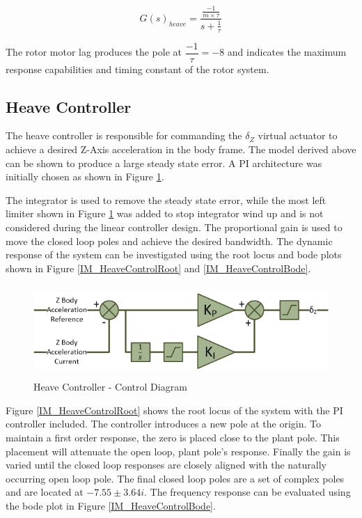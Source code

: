 \documentclass[12pt]{report}
\begin{document}
	\begin{equation}
	G(s)_{heave} = \frac{\frac{-1}{m \times \tau}}{s + \frac{1}{\tau}}\label{EQ_HeaveTF}
	\end{equation}
	
	The rotor motor lag produces the pole at $\dfrac{-1}{\tau} = -8$ and indicates the maximum response capabilities and timing constant of the rotor system.
	
	\subsection{Heave Controller}
	The heave controller is responsible for commanding the $\delta_Z$ virtual actuator to achieve a desired Z-Axis acceleration in the body frame. The model derived above can be shown to produce a large steady state error. A PI architecture was initially chosen as shown in Figure \ref{IM_HeaveController}. 
	
	The integrator is used to remove the steady state error, while the most left limiter shown in Figure \ref{IM_HeaveController} was added to stop integrator wind up and is not considered during the linear controller design. The proportional gain is used to move the closed loop poles and achieve the desired bandwidth. The dynamic response of the system can be investigated using the root locus and bode plots shown in Figure \ref{IM_HeaveControlRoot} and \ref{IM_HeaveControlBode}. 
	
	\begin{figure}[H]
		\centering
		\includegraphics[height = 3.5cm]{../References/Diagrams/HeaveController.jpg}
		\caption{Heave Controller -  Control Diagram}
		\label{IM_HeaveController}
	\end{figure}
	
	Figure \ref{IM_HeaveControlRoot} shows the root locus of the system with the PI controller included. The controller introduces a new pole at the origin. To maintain a first order response, the zero is placed close to the plant pole. This placement will attenuate the open loop, plant pole's response. Finally the gain is varied until the closed loop responses are closely aligned with the naturally occurring open loop pole. The final closed loop poles are a set of complex poles and are located at $-7.55 \pm 3.64 i$. The frequency response can be evaluated using the bode plot in Figure \ref{IM_HeaveControlBode}. 
	
\end{document}
